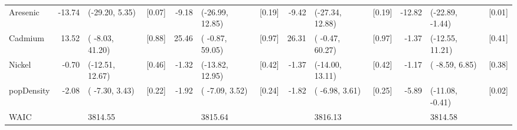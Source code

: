 \documentclass[12,]{article}
\begin{document}
\begin{landscape}
\begin{table}
\begin{tabular}[t]{lrlcrlcrlcrlc}
Aresenic & -13.74 & (-29.20,   5.35) & [0.07] & -9.18 & (-26.99,  12.85) & [0.19] & -9.42 & (-27.34,  12.88) & [0.19] & -12.82 & (-22.89,  -1.44) & [0.01]\\
Cadmium & 13.52 & ( -8.03,  41.20) & [0.88] & 25.46 & ( -0.87,  59.05) & [0.97] & 26.31 & ( -0.47,  60.27) & [0.97] & -1.37 & (-12.55,  11.21) & [0.41]\\
Nickel & -0.70 & (-12.51,  12.67) & [0.46] & -1.32 & (-13.82,  12.95) & [0.42] & -1.37 & (-14.00,  13.11) & [0.42] & -1.17 & ( -8.59,   6.85) & [0.38]\\
popDensity & -2.08 & ( -7.30,   3.43) & [0.22] & -1.92 & ( -7.09,   3.52) & [0.24] & -1.82 & ( -6.98,   3.61) & [0.25] & -5.89 & (-11.08,  -0.41) & [0.02]\\
WAIC &  & 3814.55 &  &  & 3815.64 &  &  & 3816.13 &  &  & 3814.58 & \\
\bottomrule
\end{tabular}
\end{table}
\end{landscape}
\restoregeometry

\printbibliography[title=References]
\end{document}
